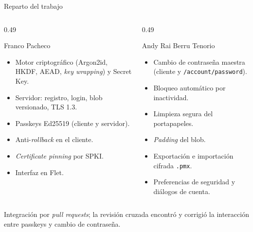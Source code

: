 \documentclass[aspectratio=169,10pt]{beamer}
\begin{document}
\begin{frame}{Reparto del trabajo}
  \begin{columns}[T]
    \begin{column}{0.49\textwidth}
      \begin{block}{\small Franco Pacheco}
        \footnotesize
        \begin{itemize}
          \item Motor criptográfico (Argon2id, HKDF, AEAD, \emph{key wrapping}) y Secret Key.
          \item Servidor: registro, login, blob versionado, TLS 1.3.
          \item Passkeys Ed25519 (cliente y servidor).
          \item Anti-\emph{rollback} en el cliente.
          \item \emph{Certificate pinning} por SPKI.
          \item Interfaz en Flet.
        \end{itemize}
      \end{block}
    \end{column}
    \begin{column}{0.49\textwidth}
      \begin{block}{\small Andy Rai Berru Tenorio}
        \footnotesize
        \begin{itemize}
          \item Cambio de contraseña maestra (cliente y \texttt{/account/password}).
          \item Bloqueo automático por inactividad.
          \item Limpieza segura del portapapeles.
          \item \emph{Padding} del blob.
          \item Exportación e importación cifrada \texttt{.pmx}.
          \item Preferencias de seguridad y diálogos de cuenta.
        \end{itemize}
      \end{block}
    \end{column}
  \end{columns}
  \vspace{2mm}
  \centering
  {\footnotesize Integración por \emph{pull requests}; la revisión cruzada encontró y corrigió la
  interacción entre passkeys y cambio de contraseña.}
\end{frame}
\end{document}
